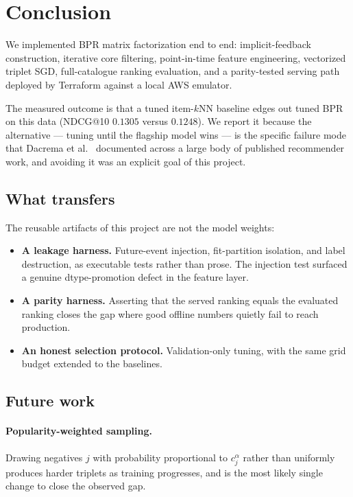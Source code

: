 \section{Conclusion}
\label{sec:conclusion}

We implemented BPR matrix factorization end to end: implicit-feedback
construction, iterative core filtering, point-in-time feature engineering,
vectorized triplet SGD, full-catalogue ranking evaluation, and a
parity-tested serving path deployed by Terraform against a local AWS
emulator.

The measured outcome is that a tuned item-$k$NN baseline edges out tuned BPR
on this data (NDCG@10 $0.1305$ versus $0.1248$). We report it because the
alternative --- tuning until the flagship model wins --- is the specific
failure mode that Dacrema et al.~\cite{dacrema2019} documented across a
large body of published recommender work, and avoiding it was an explicit
goal of this project.

\subsection{What transfers}

The reusable artifacts of this project are not the model weights:

\begin{itemize}
  \item \textbf{A leakage harness.} Future-event injection, fit-partition
        isolation, and label destruction, as executable tests rather than
        prose. The injection test surfaced a genuine dtype-promotion defect
        in the feature layer.
  \item \textbf{A parity harness.} Asserting that the served ranking equals
        the evaluated ranking closes the gap where good offline numbers
        quietly fail to reach production.
  \item \textbf{An honest selection protocol.} Validation-only tuning, with
        the same grid budget extended to the baselines.
\end{itemize}

\subsection{Future work}

\paragraph{Popularity-weighted sampling.} Drawing negatives
$j$ with probability proportional to $c_j^{\alpha}$ rather than uniformly
produces harder triplets as training progresses, and is the most likely
single change to close the observed gap.

